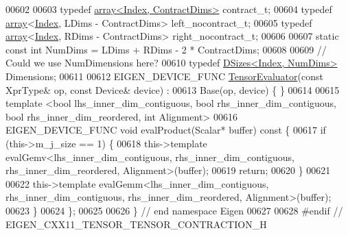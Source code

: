 \begin{DoxyCode}
00602 
00603   \textcolor{keyword}{typedef} \hyperlink{class_eigen_1_1array}{array<Index, ContractDims>} contract\_t;
00604   \textcolor{keyword}{typedef} \hyperlink{class_eigen_1_1array}{array}<\hyperlink{namespace_eigen_a62e77e0933482dafde8fe197d9a2cfde}{Index}, LDims - ContractDims> left\_nocontract\_t;
00605   \textcolor{keyword}{typedef} \hyperlink{class_eigen_1_1array}{array}<\hyperlink{namespace_eigen_a62e77e0933482dafde8fe197d9a2cfde}{Index}, RDims - ContractDims> right\_nocontract\_t;
00606 
00607   \textcolor{keyword}{static} \textcolor{keyword}{const} \textcolor{keywordtype}{int} NumDims = LDims + RDims - 2 * ContractDims;
00608 
00609   \textcolor{comment}{// Could we use NumDimensions here?}
00610   \textcolor{keyword}{typedef} \hyperlink{struct_eigen_1_1_d_sizes}{DSizes<Index, NumDims>} Dimensions;
00611 
00612   EIGEN\_DEVICE\_FUNC \hyperlink{struct_eigen_1_1_tensor_evaluator}{TensorEvaluator}(\textcolor{keyword}{const} XprType& op, \textcolor{keyword}{const} Device& device) :
00613       Base(op, device) \{ \}
00614 
00615   \textcolor{keyword}{template} <\textcolor{keywordtype}{bool} lhs\_inner\_dim\_contiguous, \textcolor{keywordtype}{bool} rhs\_inner\_dim\_contiguous, \textcolor{keywordtype}{bool} rhs\_inner\_dim\_reordered, \textcolor{keywordtype}{int}
       Alignment>
00616   EIGEN\_DEVICE\_FUNC \textcolor{keywordtype}{void} evalProduct(Scalar* buffer)\textcolor{keyword}{ const }\{
00617     \textcolor{keywordflow}{if} (this->m\_j\_size == 1) \{
00618       this->\textcolor{keyword}{template} evalGemv<lhs\_inner\_dim\_contiguous, rhs\_inner\_dim\_contiguous, rhs\_inner\_dim\_reordered,
       Alignment>(buffer);
00619       \textcolor{keywordflow}{return};
00620     \}
00621 
00622     this->\textcolor{keyword}{template} evalGemm<lhs\_inner\_dim\_contiguous, rhs\_inner\_dim\_contiguous, rhs\_inner\_dim\_reordered,
       Alignment>(buffer);
00623   \}
00624 \};
00625 
00626 \} \textcolor{comment}{// end namespace Eigen}
00627 
00628 \textcolor{preprocessor}{#endif // EIGEN\_CXX11\_TENSOR\_TENSOR\_CONTRACTION\_H}
\end{DoxyCode}
